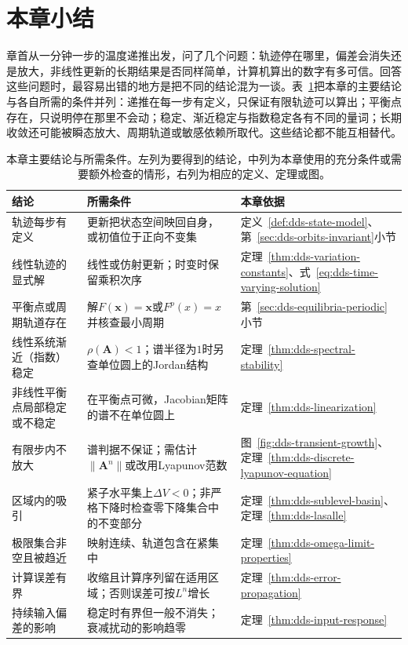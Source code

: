 
\section{本章小结}
\label{sec:dds-summary}

章首从一分钟一步的温度递推出发，问了几个问题：轨迹停在哪里，偏差会消失还是放大，非线性更新的长期结果是否同样简单，计算机算出的数字有多可信。回答这些问题时，最容易出错的地方是把不同的结论混为一谈。表~\ref{tab:dds-summary}把本章的主要结论与各自所需的条件并列：递推在每一步有定义，只保证有限轨迹可以算出；平衡点存在，只说明停在那里不会动；稳定、渐近稳定与指数稳定各有不同的量词；长期收敛还可能被瞬态放大、周期轨道或敏感依赖所取代。这些结论都不能互相替代。

\begin{table}[htbp]
  \centering
  \begin{tabularx}{\linewidth}{>{\raggedright\arraybackslash}p{30mm}>{\raggedright\arraybackslash}X>{\raggedright\arraybackslash}p{42mm}}
    \toprule
    结论 & 所需条件 & 本章依据\\
    \midrule
    轨迹每步有定义 & 更新把状态空间映回自身，或初值位于正向不变集 & 定义~\ref{def:dds-state-model}、第~\ref{sec:dds-orbits-invariant}小节\\
    线性轨迹的显式解 & 线性或仿射更新；时变时保留乘积次序 & 定理~\ref{thm:dds-variation-constants}、式~\eqref{eq:dds-time-varying-solution}\\
    平衡点或周期轨道存在 & 解$F(\bm x)=\bm x$或$F^p(x)=x$并核查最小周期 & 第~\ref{sec:dds-equilibria-periodic}小节\\
    线性系统渐近（指数）稳定 & $\rho(\bm A)<1$；谱半径为$1$时另查单位圆上的Jordan结构 & 定理~\ref{thm:dds-spectral-stability}\\
    非线性平衡点局部稳定或不稳定 & 在平衡点可微，Jacobian矩阵的谱不在单位圆上 & 定理~\ref{thm:dds-linearization}\\
    有限步内不放大 & 谱判据不保证；需估计$\lVert\bm A^n\rVert$或改用Lyapunov范数 & 图~\ref{fig:dds-transient-growth}、定理~\ref{thm:dds-discrete-lyapunov-equation}\\
    区域内的吸引 & 紧子水平集上$\Delta V<0$；非严格下降时检查零下降集合中的不变部分 & 定理~\ref{thm:dds-sublevel-basin}、定理~\ref{thm:dds-lasalle}\\
    极限集合非空且被趋近 & 映射连续、轨道包含在紧集中 & 定理~\ref{thm:dds-omega-limit-properties}\\
    计算误差有界 & 收缩且计算序列留在适用区域；否则误差可按$L^n$增长 & 定理~\ref{thm:dds-error-propagation}\\
    持续输入偏差的影响 & 稳定时有界但一般不消失；衰减扰动的影响趋零 & 定理~\ref{thm:dds-input-response}\\
    \bottomrule
  \end{tabularx}
  \caption{本章主要结论与所需条件。左列为要得到的结论，中列为本章使用的充分条件或需要额外检查的情形，右列为相应的定义、定理或图。}
  \label{tab:dds-summary}
\end{table}


